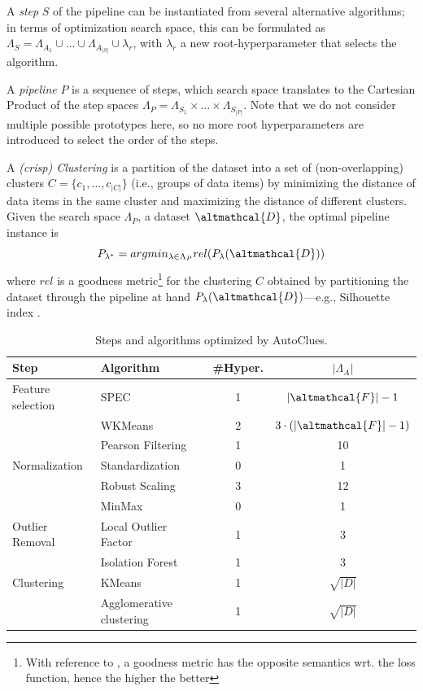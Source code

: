 A \textit{step} $S$ of the pipeline can be instantiated from several alternative algorithms; in terms of optimization search space, this can be formulated as $\Lambda_S = \Lambda_{A_1} \cup \ldots \cup \Lambda_{A_{|S|}} \cup \lambda_r$, with $\lambda_r$ a new root-hyperparameter that selects the algorithm.

A \textit{pipeline} $P$ is a sequence of steps, which search space translates to the Cartesian Product of the step spaces $\Lambda_P = \Lambda_{S_1} \times \ldots \times \Lambda_{S_{|P|}}$.
Note that we do not consider multiple possible prototypes here, so no more root hyperparameters are introduced to select the order of the steps.

A \textit{(crisp) Clustering} is a partition of the dataset into a set of (non-overlapping) clusters  $C=\{c_1, \ldots, c_{|C|}\}$ (i.e., groups of data items) by minimizing the distance of data items in the same cluster and maximizing the distance of different clusters.
Given the search space $\Lambda_P$, a dataset $\altmathcal{D}$, the optimal pipeline instance is
\begin{equation}
\label{eq:optimization}
    P_{\lambda^*} = argmin_{\lambda \in \Lambda_P} rel(P_{\lambda}(\altmathcal{D}))
\end{equation}
where $rel$ is a goodness metric\footnote{With reference to , a goodness metric has the opposite semantics wrt. the loss function, hence the higher the better} for the clustering $C$ obtained by partitioning the dataset through the pipeline at hand $P_{\lambda}(\altmathcal{D})$---e.g., Silhouette index \cite{zhu2010clustering}.


\begin{table}[!ht]
    \centering
    \begin{tabular}{lp{5cm}cc}
        \hline
        Step     & Algorithm & \#Hyper. & $|\Lambda_A|$\\\hline
        Feature selection & SPEC \cite{zhao2007spectral} & 1 & $|\altmathcal{F}|-1$\\
         & WKMeans \cite{WKMeans} & 2 & $3 \cdot (|\altmathcal{F}|-1)$\\
         & Pearson Filtering & 1 & 10\\
        Normalization     & Standardization & 0 & 1\\
        & Robust Scaling & 3 & 12\\
        & MinMax & 0 & 1\\
        Outlier Removal   & Local Outlier Factor \cite{breunig2000lof} & 1 & 3\\
        & Isolation Forest \cite{liu2012isolation} & 1 & 3\\
        Clustering  & KMeans \cite{arthur2006k} & 1 & $\sqrt{|D|}$\\
        & Agglomerative clustering  \cite{murtagh2017algorithms} & 1 & $\sqrt{|D|}$\\\hline
    \end{tabular}
    \caption{Steps and algorithms optimized by AutoClues.}
    \label{clustering-tbl:processing}
\end{table}


